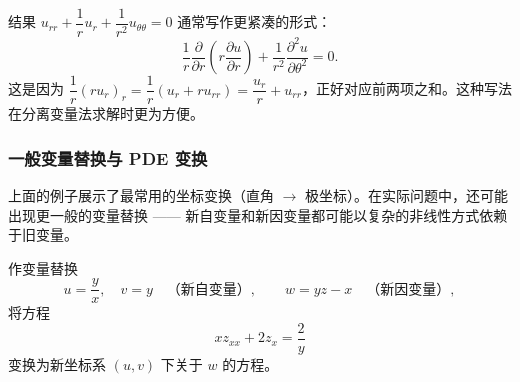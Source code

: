 \documentclass[lang=cn,11pt]{elegantbook}
\begin{document}
\begin{note}
结果 $u_{rr}+\dfrac{1}{r}u_r+\dfrac{1}{r^2}u_{\theta\theta}=0$ 通常写作更紧凑的形式：
\[
\frac{1}{r}\frac{\partial}{\partial r}\!\left(r\frac{\partial u}{\partial r}\right)
+\frac{1}{r^2}\frac{\partial^2 u}{\partial\theta^2}=0.
\]
这是因为 $\dfrac{1}{r}(ru_r)_r=\dfrac{1}{r}(u_r+ru_{rr})=\dfrac{u_r}{r}+u_{rr}$，正好对应前两项之和。这种写法在分离变量法求解时更为方便。
\end{note}

\subsubsection*{一般变量替换与 PDE 变换}

上面的例子展示了最常用的坐标变换（直角 $\to$ 极坐标）。在实际问题中，还可能出现更一般的变量替换 —— 新自变量和新因变量都可能以复杂的非线性方式依赖于旧变量。

\begin{example} \label{ex:variable-change-pde}
作变量替换
\[
u=\frac{y}{x},\quad v=y\quad\text{（新自变量）},\qquad
w=yz-x\quad\text{（新因变量）},
\]
将方程
\[
xz_{xx}+2z_x=\frac{2}{y}
\]
变换为新坐标系 $(u,v)$ 下关于 $w$ 的方程。
\end{example}
\end{document}
